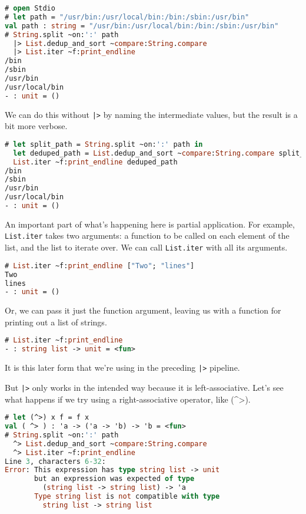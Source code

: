 \begin{lstlisting}[language=Caml]
# open Stdio
# let path = "/usr/bin:/usr/local/bin:/bin:/sbin:/usr/bin"
val path : string = "/usr/bin:/usr/local/bin:/bin:/sbin:/usr/bin"
# String.split ~on:':' path
  |> List.dedup_and_sort ~compare:String.compare
  |> List.iter ~f:print_endline
/bin
/sbin
/usr/bin
/usr/local/bin
- : unit = ()
\end{lstlisting}

We can do this without \passthrough{\lstinline!|>!} by naming the
intermediate values, but the result is a bit more verbose.

\begin{lstlisting}[language=Caml]
# let split_path = String.split ~on:':' path in
  let deduped_path = List.dedup_and_sort ~compare:String.compare split_path in
  List.iter ~f:print_endline deduped_path
/bin
/sbin
/usr/bin
/usr/local/bin
- : unit = ()
\end{lstlisting}

An important part of what's happening here is partial application. For
example, \passthrough{\lstinline!List.iter!} takes two arguments: a
function to be called on each element of the list, and the list to
iterate over. We can call \passthrough{\lstinline!List.iter!} with all
its arguments. 

\begin{lstlisting}[language=Caml]
# List.iter ~f:print_endline ["Two"; "lines"]
Two
lines
- : unit = ()
\end{lstlisting}

Or, we can pass it just the function argument, leaving us with a
function for printing out a list of strings.

\begin{lstlisting}[language=Caml]
# List.iter ~f:print_endline
- : string list -> unit = <fun>
\end{lstlisting}

It is this later form that we're using in the preceding
\passthrough{\lstinline!|>!} pipeline.

But \passthrough{\lstinline!|>!} only works in the intended way because
it is left-associative. Let's see what happens if we try using a
right-associative operator, like (\^{}\textgreater).

\begin{lstlisting}[language=Caml]
# let (^>) x f = f x
val ( ^> ) : 'a -> ('a -> 'b) -> 'b = <fun>
# String.split ~on:':' path
  ^> List.dedup_and_sort ~compare:String.compare
  ^> List.iter ~f:print_endline
Line 3, characters 6-32:
Error: This expression has type string list -> unit
       but an expression was expected of type
         (string list -> string list) -> 'a
       Type string list is not compatible with type
         string list -> string list
\end{lstlisting}

